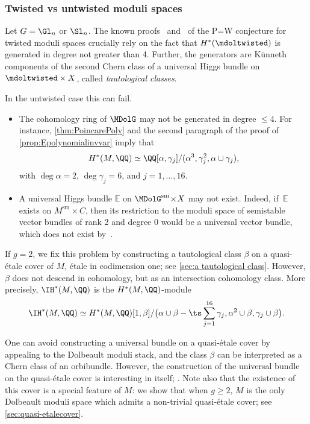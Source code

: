 \subsubsection*{Twisted vs untwisted moduli spaces} Let $G=\Gl_n$ or $\Sl_n$. The known proofs~\cite{deCataldoHauselMigliorini2012} and~\cite{deCataldoMaulikShen2019} of the P=W conjecture for twisted moduli spaces crucially rely on the fact that $H^*(\mdoltwisted)$ is generated in degree not greater than 4. Further, the generators are Künneth components of the second Chern class of a universal Higgs bundle on $\mdoltwisted \times X$, called \emph{tautological classes}.

In the untwisted case this can fail.
\begin{itemize}
\item The cohomology ring of $\MDolG$ may not be generated in degree $\leq 4$. For instance, \cref{thm:PoincarePoly} and the second paragraph of the proof of \cref{prop:Epolynomialinvvar} imply that\vspace*{-3pt}\enlargethispage{.5\baselineskip}%
\[
H^*(M, \QQ) \simeq \QQ[\alpha, \gamma_j]/(\alpha^3, \gamma_j^2, \alpha\cup \gamma_j),
\]
with $\deg \alpha =2$, $\deg \gamma_j = 6$, and $j=1, \ldots, 16$.
\item A universal Higgs bundle $\mathbb{E}$ on $\MDolG^{\mathrm{sm}}\!\times\! X$ may not exist. Indeed, if~$\mathbb{E}$ exists on $M^{\mathrm{sm}}\!\times\! C$, then its restriction to the moduli space of semistable vector bundles of rank 2 and degree 0 would be a universal vector bundle, which does not exist by~\cite{NR69}.
\end{itemize}

If $g=2$, we fix this problem by constructing a tautological class $\beta$ on a quasi-étale cover of $M$, \ie étale in codimension one; see \cref{sec:a tautological class}. However, $\beta$ does not descend in cohomology, but as an intersection cohomology class. More precisely, $\IH^*(M, \QQ)$ is the $H^*(M,\QQ)$-module\vspace*{-3pt}
\[
\IH^*(M, \QQ) \simeq H^*(M,\QQ) [ 1, \beta ]/\bigl(\alpha \cup \beta - \ts\sum^{16}_{j=1}\gamma_j, \alpha^2 \cup \beta, \gamma_j \cup \beta \bigr).
\]

One can avoid constructing a universal bundle on a quasi-étale cover by appealing to the Dolbeault moduli stack, and the class $\beta$ can be interpreted as a Chern class of an orbibundle. However, the construction of the universal bundle on the quasi-étale cover is interesting in itself; \cf \cite[\S 6.1]{HeuLoray19}. Note also that the existence of this cover is a special feature of $M$: we show that when $g \geq 2$, $M$ is the only Dolbeault moduli space which admits a non-trivial quasi-étale cover; see \cref{sec:quasi-etalecover}.

